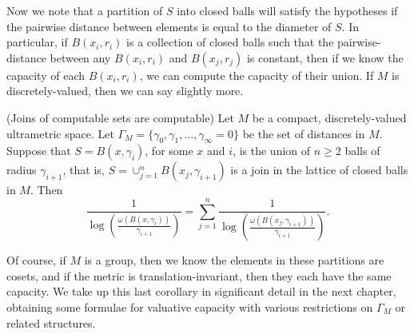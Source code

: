 Now we note that a partition of $S$ into closed balls will satisfy the hypotheses if the pairwise distance between elements is equal to the diameter of $S$. In particular, if $B(x_i,r_i)$ is a collection of closed balls such that the pairwise-distance between any $B(x_i,r_i)$ and $B(x_j,r_j)$ is constant, then if we know the capacity of each $B(x_i,r_i)$, we can compute the capacity of their union. If $M$ is discretely-valued, then we can say slightly more.\\ 
\begin{corollary}
	(Joins of computable sets are computable) Let $M$ be a compact, discretely-valued ultrametric space. Let $\Gamma_M = \{\gamma_0, \gamma_1,\ldots, \gamma_\infty=0\}$ be the set of distances in $M$. Suppose that $S = B(x, \gamma_i)$,  for some $x$ and $i$, is the union of $n \geq 2$ balls of radius $\gamma_{i+1}$, that is, $S=\cup_{j=1}^n B(x_j, \gamma_{i+1})$ is a join in the lattice of closed balls in $M$. Then 
	\[\frac{1}{\log(\frac{\omega(B(x, \gamma_i))}{\gamma_{i+1}} )} = \sum_{j=1}^n \frac{1}{\log(\frac{\omega(B(x_j, \gamma_{i+1}))}{\gamma_{i+1} })}.\]
\end{corollary}

Of course, if $M$ is a group, then we know the elements in these partitions are cosets, and if the metric is translation-invariant, then they each have the same capacity. We take up this last corollary in significant detail in the next chapter, obtaining some formulae for valuative capacity with various restrictions on $\Gamma_M$ or related structures.